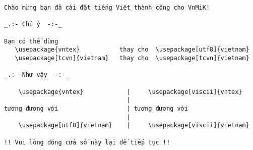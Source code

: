\documentclass{article}
\begin{document}
\begin{verbatim}
Chào mừng bạn đã cài đặt tiếng Việt thành công cho VnMiK!

_.:- Chú ý  -:-_

Bạn có thể dùng
   \usepackage{vntex}           thay cho  \usepackage[utf8]{vietnam}
   \usepackage[tcvn]{vietnam}   thay cho  \usepackage[tcvn]{vietnam}

_.:- Như vậy  -:-_

    \usepackage{vntex}            |     \usepackage[viscii]{vntex} 
                                  |
tương đương với                   | tương đương với
                                  |
    \usepackage[utf8]{vietnam}    |     \usepackage[viscii]{vietnam}

!! Vui lòng đóng cửa sổ này lại để tiếp tục !!	
\end{verbatim}
\end{document}
